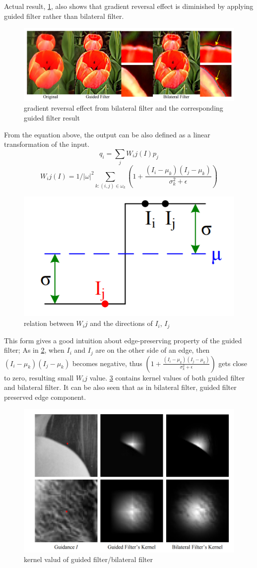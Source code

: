 \documentclass[extendedabs]{bmvc2k}
\begin{document}
Actual result, \figurename{\ref{fig:4}}, also shows that gradient reversal effect is diminished by 
applying guided filter rather than bilateral filter.
\begin{figure}[h]
    \centering
    \includegraphics[width=\linewidth]{hw2_1_4}
    \caption{gradient reversal effect from bilateral filter and the corresponding guided filter result}
    \label{fig:4}
\end{figure}

From the equation above, the output can be also defined as a linear transformation of the input.
\[q_i = \sum_{j}W_ij(I)p_j\]
\[W_ij(I) = 1/|\omega|^2\sum_{k:(i,j) \in \omega_k}(1 + \frac{(I_i - \mu_k)(I_j - \mu_k)}{\sigma_k^2 + \epsilon})\]

\begin{figure}[h]
    \centering
    \includegraphics[width=0.3\linewidth]{hw2_1_3}
    \caption{relation between $W_ij$ and the directions of $I_i$, $I_j$}
    \label{fig:3}
\end{figure}

This form gives a good intuition about edge-preserving property of the guided filter;
As in \figurename{\ref{fig:3}}, when $I_i$ and $I_j$ are on the other side of an edge, 
then $(I_i-\mu_k)(I_j-\mu_k)$ becomes negative, 
thus $(1 + \frac{(I_i - \mu_k)(I_j - \mu_k)}{\sigma_k^2 + \epsilon})$ gets close to zero,
resulting small $W_ij$ value.
\figurename{\ref{fig:5}} contains kernel values of both guided filter and bilateral filter.
It can be also seen that as in bilateral filter, guided filter preserved edge component.

\begin{figure}[h]
    \centering
    \includegraphics[width=0.8\linewidth]{hw2_1_5}
    \caption{kernel valud of guided filter/bilateral filter}
    \label{fig:5}
\end{figure}
\end{document}

